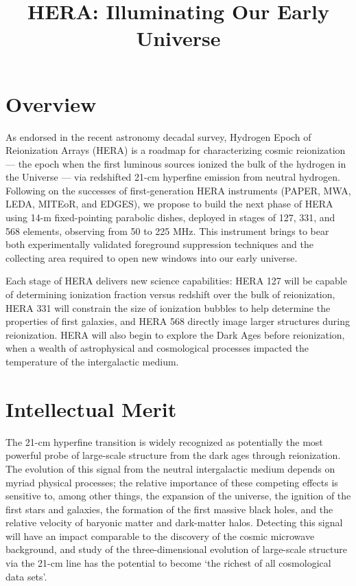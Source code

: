 \documentclass[preprint]{aastex}
\begin{document}
\pagestyle{empty}

\title{HERA: Illuminating Our Early Universe}

\section*{Overview}

As endorsed in the recent astronomy decadal survey, 
Hydrogen Epoch of Reionization Arrays (HERA) is a roadmap for characterizing
cosmic reionization --- the epoch when the first luminous sources ionized the
bulk of the hydrogen in the Universe --- via redshifted 21-cm hyperfine
emission from neutral hydrogen.  Following on the successes of first-generation
HERA instruments (PAPER, MWA, LEDA, MITEoR, and EDGES), we propose to build
the next phase of HERA using 14-m fixed-pointing parabolic dishes, deployed in
stages of 127, 331, and 568 elements, observing from 50 to 225 MHz.
This instrument brings to bear both experimentally validated
foreground suppression techniques and the collecting area required to open new windows into our early
universe.  

Each stage of HERA delivers new science capabilities:
HERA 127 will be capable of determining
ionization fraction versus redshift over the bulk of reionization,
HERA 331 will constrain the size of ionization bubbles to help determine the properties of
first galaxies, and HERA 568 directly image larger structures during
reionization.  HERA will also begin to explore the Dark Ages before 
reionization, when a wealth of astrophysical and cosmological processes
impacted the temperature of the intergalactic medium.

\section*{Intellectual Merit}

The 21-cm hyperfine transition is widely recognized as potentially the most
powerful probe of large-scale structure from the dark ages through
reionization.  The evolution of this signal from the neutral intergalactic
medium depends on myriad physical processes; the relative importance of
these competing effects is sensitive to, among other things, the expansion of
the universe, the ignition of the first stars and galaxies, the formation of
the first massive black holes, and the relative
velocity of baryonic matter and dark-matter halos.
Detecting this signal will have an impact
comparable to the discovery of the cosmic microwave background, and study of the three-dimensional
evolution of large-scale structure via the 21-cm line has the
potential to become `the richest of all cosmological data sets'.
\end{document}

